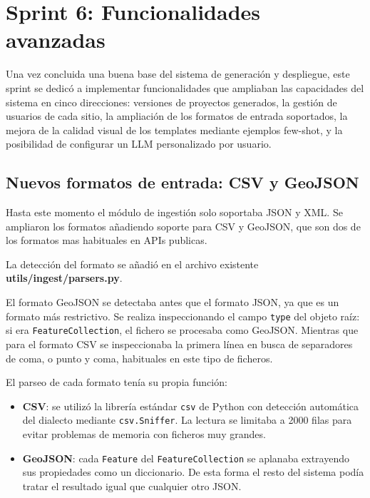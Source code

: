 \section{Sprint 6: Funcionalidades avanzadas}
\label{sec:funcionalidades-avanzadas}

Una vez concluida una buena base del sistema de generación y despliegue, 
este sprint se dedicó a implementar funcionalidades que ampliaban las 
capacidades del sistema en cinco direcciones: versiones de proyectos generados, la gestión de usuarios de cada sitio, la ampliación de los formatos de entrada soportados, la mejora de la calidad visual de los templates mediante ejemplos few-shot, y la posibilidad de configurar un LLM personalizado por usuario.

\subsection{Nuevos formatos de entrada: CSV y GeoJSON}
\label{subsec:nuevos-formatos-entrada}

Hasta este momento el módulo de ingestión solo soportaba JSON y XML. Se ampliaron los formatos añadiendo soporte para CSV y GeoJSON, que son dos de los formatos mas habituales en APIs publicas.

La detección del formato se añadió en el archivo existente \textbf{utils/ingest/parsers.py}. 

El formato GeoJSON se detectaba antes que el formato JSON, ya que es un formato más restrictivo. Se realiza inspeccionando el campo \texttt{type} del objeto raíz: si era \texttt{FeatureCollection}, el fichero se procesaba como GeoJSON. Mientras que para el formato CSV se inspeccionaba la primera línea en busca de separadores de coma, o punto y coma, habituales en este tipo de ficheros.

El parseo de cada formato tenía su propia función:

\begin{itemize}
    \item \textbf{CSV}: se utilizó la librería estándar \texttt{csv} de Python con detección automática del dialecto mediante \texttt{csv.Sniffer}. La lectura se limitaba a 2000 filas para evitar problemas de memoria con ficheros muy grandes.
    \item \textbf{GeoJSON}: cada \texttt{Feature} del \texttt{FeatureCollection} se aplanaba extrayendo sus propiedades como un diccionario. De esta forma el resto del sistema podía tratar el resultado igual que cualquier otro JSON.
\end{itemize}

